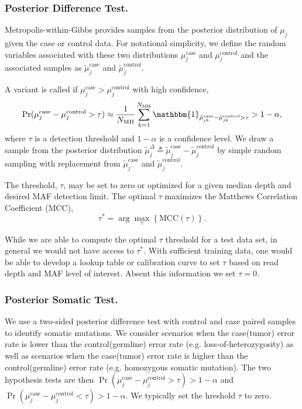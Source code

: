 \documentclass{bioinfo}
\begin{document}
\subsubsection*{Posterior Difference Test.}
Metropolis-within-Gibbs provides samples from the posterior distribution of $\mu_j$ given the case or control data. For notational simplicity, we define the random variables associated with these two distributions $\mu_j^{\text{case}}$ and $\mu_j^{\text{control}}$ and the associated samples as $\tilde{\mu}_j^{\text{case}}$ and $\tilde{\mu}_j^{\text{control}}$.

A variant is called if $\mu_j^{\text{case}} > \mu_j^{\text{control}}$ with high confidence,
\begin{equation}\label{eqn:bayes_test}
	\Pr( \mu_j^{\text{case}} - \mu_j^{\text{control}}  > \tau ) \approx \frac{1}{N_{\text{MH}}} \sum_{k=1}^{N_{\text{MH}}} \mathbbm{1}_{\tilde{\mu}_{jk}^{\text{case}} - \tilde{\mu}_{jk}^{\text{control}} > \tau } > 1-\alpha,
\end{equation}
where $\tau$ is a detection threshold and $1-\alpha$ is a confidence level. We draw a sample from the posterior distribution $\tilde{\mu}_j^{\Delta} \triangleq \tilde{\mu}_j^{\text{case}} - \tilde{\mu}_j^{\text{control}}$ by simple random sampling with replacement from $\tilde{\mu}_j^{\text{case}}$ and $\tilde{\mu}_j^{\text{control}}$.

The threshold, $\tau$, may be set to zero or optimized for a given median depth and desired MAF detection limit. The optimal $\tau$ maximizes the Matthews Correlation Coefficient (MCC),
\begin{equation}
	\tau^* = \arg\max_\tau \left\{ \text{MCC}(\tau)\right\}.
\end{equation}

While we are able to compute the optimal $\tau$ threshold for a test data set, in general we would not have access to $\tau^*$. With sufficient training data, one would be able to develop a lookup table or calibration curve to set $\tau$ based on read depth and MAF level of interest. Absent this information we set $\tau = 0$.

\subsubsection*{Posterior Somatic Test.}

We use a two-sided posterior difference test with control and case paired samples to identify somatic mutations. We consider scenarios when the case(tumor) error rate is lower than the control(germline) error rate (e.g. loss-of-heterozygosity) as well as scenarios when the case(tumor) error rate is higher than the control(germline) error rate (e.g. homozygous somatic mutation). The two hypothesis tests are then $\Pr( \mu_j^{\text{case}} - \mu_j^{\text{control}} > \tau ) > 1-\alpha$ and $\Pr( \mu_j^{\text{case}} - \mu_j^{\text{control}} < \tau ) > 1-\alpha$. We typically set the hreshold $ \tau $ to zero.
\end{document}
